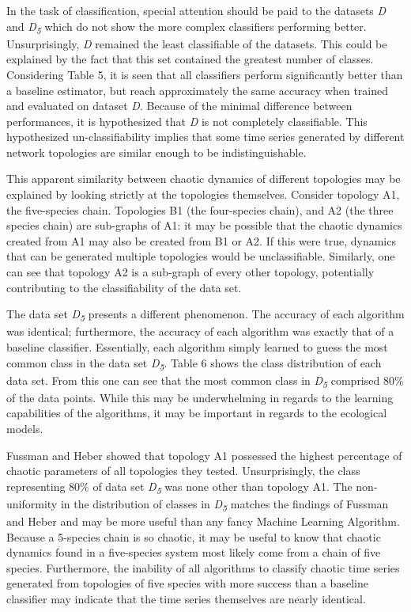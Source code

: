 \documentclass[letterpaper, 10 pt, conference]{ieeeconf}  %
\begin{document}
    In the task of classification, special attention should be paid to the datasets \textit{D} and \textit{D\textsubscript{5}} which do not show the more complex classifiers performing better. Unsurprisingly, \textit{D} remained the least classifiable of the datasets. This could be explained by the fact that this set contained the greatest number of classes. Considering Table 5, it is seen that all classifiers perform significantly better than a baseline estimator, but reach approximately the same accuracy when trained and evaluated on dataset \textit{D}. Because of the minimal difference between performances, it is hypothesized that \textit{D} is not completely classifiable. This hypothesized un-classifiability implies that some time series generated by different network topologies are similar enough to be indistinguishable. 
    
    This apparent similarity between chaotic dynamics of different topologies may be explained by looking strictly at the topologies themselves. Consider topology A1, the five-species chain. Topologies B1 (the four-species chain), and A2 (the three species chain) are sub-graphs of A1: it may be possible that the chaotic dynamics created from A1 may also be created from B1 or A2. If this were true, dynamics that can be generated multiple topologies would be unclassifiable. Similarly, one can see that topology A2 is a sub-graph of every other topology, potentially contributing to the classifiability of the data set. 

    The data set \textit{D\textsubscript{5}} presents a different phenomenon. The accuracy of each algorithm was identical; furthermore, the accuracy of each algorithm was exactly that of a baseline classifier. Essentially,  each algorithm simply learned to guess the most common class in the data set \textit{D\textsubscript{5}}. Table 6 shows the class distribution of each data set. From this one can see that the most common class in \textit{D\textsubscript{5}} comprised 80\% of the data points. While this may be underwhelming in regards to the learning capabilities of the algorithms, it may be important in regards to the ecological models. 

    Fussman and Heber showed that topology A1 possessed the highest percentage of chaotic parameters of all topologies they tested. Unsurprisingly, the class representing 80\% of data set \textit{D\textsubscript{5}} was none other than topology A1. The non-uniformity in the distribution of classes in \textit{D\textsubscript{5}} matches the findings of Fussman and Heber and may be more useful than any fancy Machine Learning Algorithm. Because a 5-species chain is so chaotic, it may be useful to know that chaotic dynamics found in a five-species system most likely come from a chain of five species. Furthermore, the inability of all algorithms to classify chaotic time series generated from topologies of five species with more success than a baseline classifier may indicate that the time series themselves are nearly identical. 
    
\end{document}
